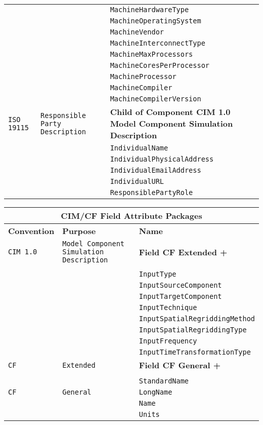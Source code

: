 \begin{tabular}{|p{4cm}|p{4cm}|p{8cm}|}
     & & {\tt MachineHardwareType} \\
     & & {\tt MachineOperatingSystem} \\
     & & {\tt MachineVendor} \\
     & & {\tt MachineInterconnectType} \\
     & & {\tt MachineMaxProcessors} \\
     & & {\tt MachineCoresPerProcessor} \\
     & & {\tt MachineProcessor} \\
     & & {\tt MachineCompiler} \\
     & & {\tt MachineCompilerVersion} \\
\hline
{\tt ISO 19115} & {\tt Responsible Party Description} & {\bf Child of Component CIM 1.0 Model Component Simulation Description}\\
     & & {\tt IndividualName} \\
     & & {\tt IndividualPhysicalAddress} \\
     & & {\tt IndividualEmailAddress} \\
     & & {\tt IndividualURL} \\
     & & {\tt ResponsiblePartyRole} \\
\hline
\end{tabular}

\vspace{18pt}

\label{CIMFieldAttributePackages}
\begin{tabular}{|p{4cm}|p{4cm}|p{6cm}|}
\hline
\multicolumn{3}{|c|}{{\bf \large CIM/CF Field Attribute Packages}} \\
\hline\hline
{\bf Convention} & {\bf Purpose} & {\bf Name} \\
\hline\hline
{\tt CIM 1.0} & {\tt Model Component Simulation Description} & {\bf Field CF Extended +} \\
& & \\
& & {\tt InputType}  \\
 & & {\tt InputSourceComponent} \\ 
 & & {\tt InputTargetComponent} \\ 
 & & {\tt InputTechnique} \\ 
 & & {\tt InputSpatialRegriddingMethod} \\ 
 & & {\tt InputSpatialRegriddingType} \\ 
 & & {\tt InputFrequency} \\ 
 & & {\tt InputTimeTransformationType} \\ 
\hline
{\tt CF} & {\tt Extended} & {\bf Field CF General +} \\
& & \\
& & {\tt StandardName}\\ 
\hline
{\tt CF} & {\tt General} & {\tt LongName}\\
     & & {\tt Name} \\
     & & {\tt Units}  \\
\hline
\end{tabular}

